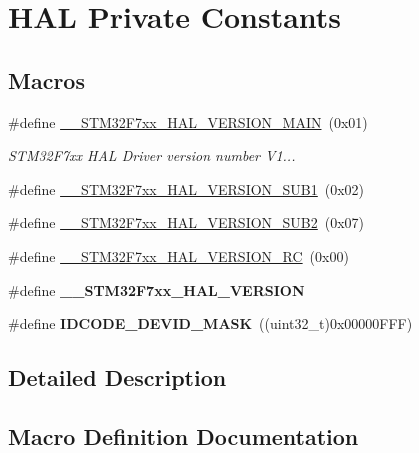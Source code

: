 \hypertarget{group___h_a_l___private___constants}{}\section{H\+AL Private Constants}
\label{group___h_a_l___private___constants}
\subsection*{Macros}
\begin{DoxyCompactItemize}
\item 
\#define \mbox{\hyperlink{group___h_a_l___private___constants_ga44c7835c74e12c08ffff5d5008e1c7d2}{\+\_\+\+\_\+\+S\+T\+M32\+F7xx\+\_\+\+H\+A\+L\+\_\+\+V\+E\+R\+S\+I\+O\+N\+\_\+\+M\+A\+IN}}~(0x01)
\begin{DoxyCompactList}\small\item\em S\+T\+M32\+F7xx H\+AL Driver version number V1... \end{DoxyCompactList}\item 
\#define \mbox{\hyperlink{group___h_a_l___private___constants_gaa50b8a8eea0b0d74461deb22c4c04202}{\+\_\+\+\_\+\+S\+T\+M32\+F7xx\+\_\+\+H\+A\+L\+\_\+\+V\+E\+R\+S\+I\+O\+N\+\_\+\+S\+U\+B1}}~(0x02)
\item 
\#define \mbox{\hyperlink{group___h_a_l___private___constants_ga53dbff262abd744a6cdde1ddd80a74e2}{\+\_\+\+\_\+\+S\+T\+M32\+F7xx\+\_\+\+H\+A\+L\+\_\+\+V\+E\+R\+S\+I\+O\+N\+\_\+\+S\+U\+B2}}~(0x07)
\item 
\#define \mbox{\hyperlink{group___h_a_l___private___constants_ga2935dc0e8f6abda089852a4fa1fd08e4}{\+\_\+\+\_\+\+S\+T\+M32\+F7xx\+\_\+\+H\+A\+L\+\_\+\+V\+E\+R\+S\+I\+O\+N\+\_\+\+RC}}~(0x00)
\item 
\#define {\bfseries \+\_\+\+\_\+\+S\+T\+M32\+F7xx\+\_\+\+H\+A\+L\+\_\+\+V\+E\+R\+S\+I\+ON}
\item 
\mbox{\label{group___h_a_l___private___constants_gaeeece10cca80f3c632d3d77c3f2917b6}} 
\#define {\bfseries I\+D\+C\+O\+D\+E\+\_\+\+D\+E\+V\+I\+D\+\_\+\+M\+A\+SK}~((uint32\+\_\+t)0x00000\+F\+F\+F)
\end{DoxyCompactItemize}


\subsection{Detailed Description}


\subsection{Macro Definition Documentation}
\mbox{\label{group___h_a_l___private___constants_gaf8aa58ffb2b48ff6c23db0746e7a414d}} 
